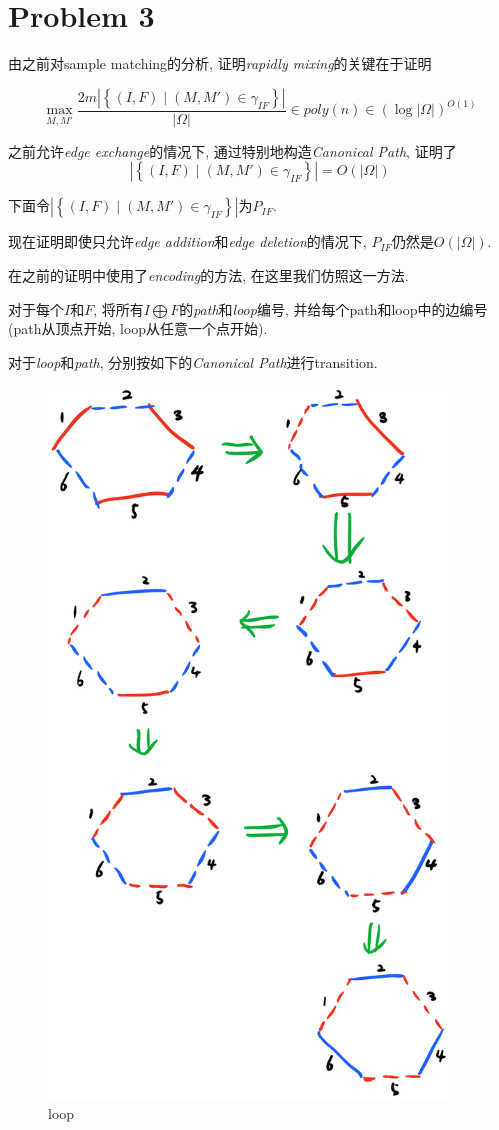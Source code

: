 \documentclass[paper=a4, fontsize=11pt]{scrartcl} %
\numberwithin{figure}{section} %
\numberwithin{table}{section} %
\begin{document}
\section*{Problem 3}
	由之前对sample matching的分析, 证明\textit{rapidly mixing}的关键在于证明

	\[
		\max_{M,M'}\frac{2m
		\left| \left\{
		(I,F) \mid (M,M')\in \gamma_{IF}
		\right\} \right|
		}{|\Omega|} \in \textit{poly}(n) \in \left(\log |\Omega|\right)^{O(1)}
	\]	
	
	之前允许\textit{edge exchange}的情况下, 通过特别地构造\textit{Canonical Path}, 证明了$$\left| \left\{
		(I,F) \mid (M,M')\in \gamma_{IF}
		\right\} \right|= O(|\Omega|)$$
	
	下面令$\left| \left\{
		(I,F) \mid (M,M')\in \gamma_{IF}
		\right\} \right|$为$P_{IF}$.

	现在证明即使只允许\textit{edge addition}和\textit{edge deletion}的情况下, $P_{IF}$仍然是$O(|\Omega|)$.

	在之前的证明中使用了\textit{encoding}的方法, 在这里我们仿照这一方法.

	对于每个$I$和$F$, 将所有$I\bigoplus F$的\textit{path}和\textit{loop}编号, 并给每个path和loop中的边编号(path从顶点开始, loop从任意一个点开始).

	对于\textit{loop}和\textit{path}, 分别按如下的\textit{Canonical Path}进行transition. 
	\begin{figure}[H]
	\centering
	\includegraphics[width=300pt]{pic2.png}
	\caption*{loop}
	\end{figure}
\end{document}
